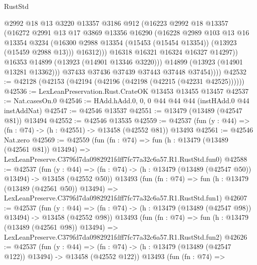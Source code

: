 \begin{lexlean}{RustStd}
\begin{coremodule}
                    @2992
                    @18
                    @13
                    @3220
                    @13357
                    @3186
                    @912
                    (@16223
                      @2992
                      @18
                      @13357
                      (@16272
                        @2991
                        @13
                        @17
                        @3869
                        @13356
                        @16290
                        (@16228
                          @2989
                          @103
                          @13
                          @16
                          @13354
                          @3234
                          (@16300 @2988 @13354 (@15453 (@15454 @13354)) (@13923 (@15459 @2988 @13)))
                          @16312)))
                    @16318
                    @16321
                    @16324
                    @16327
                    @14297))
                @16353
                @14899
                (@13923 (@14901 @13346 @3220)))
              @14899
              (@13923 (@14901 @13281 @13362)))
            @37433
            @37436
            @37439
            @37443
            @37448
            @37454))))
@42532 := @42128 (@42153 (@42194 (@42196 (@42198 (@42215 (@42231 @42525))))))
@42536 := LexLeanPreservation.Rust.CrateOK @13453 @13455 @13457
@42537 := Nat.casesOn.{0}
@42546 := HAdd.hAdd.{0, 0, 0} @44 @44 @44 (instHAdd.{0} @44 instAddNat)
@42547 := @42546 @13537
@42551 := @13479 (@13489 (@42547 @81)) @13494
@42552 := @42546 @13535
@42559 := @42537 (fun (y : @44) => (fn : @74) -> (h : @42551) -> @13458 (@42552 @81)) @13493
@42561 := @42546 Nat.zero
@42569 := @42559
    (fun (fn : @74) =>
    fun (h : @13479 (@13489 (@42561 @81)) @13494) =>
    LexLeanPreserve.C379fd7da0982921fdff7fc77a32c6a57.R1.RustStd.fun0)
@42588 := @42537
    (fun (y : @44) =>
    (fn : @74) -> (h : @13479 (@13489 (@42547 @50)) @13494) -> @13458 (@42552 @50))
    @13493
    (fun (fn : @74) =>
    fun (h : @13479 (@13489 (@42561 @50)) @13494) =>
    LexLeanPreserve.C379fd7da0982921fdff7fc77a32c6a57.R1.RustStd.fun1)
@42607 := @42537
    (fun (y : @44) =>
    (fn : @74) -> (h : @13479 (@13489 (@42547 @98)) @13494) -> @13458 (@42552 @98))
    @13493
    (fun (fn : @74) =>
    fun (h : @13479 (@13489 (@42561 @98)) @13494) =>
    LexLeanPreserve.C379fd7da0982921fdff7fc77a32c6a57.R1.RustStd.fun2)
@42626 := @42537
    (fun (y : @44) =>
    (fn : @74) -> (h : @13479 (@13489 (@42547 @122)) @13494) -> @13458 (@42552 @122))
    @13493
    (fun (fn : @74) =>

\end{coremodule}
\end{lexlean}

